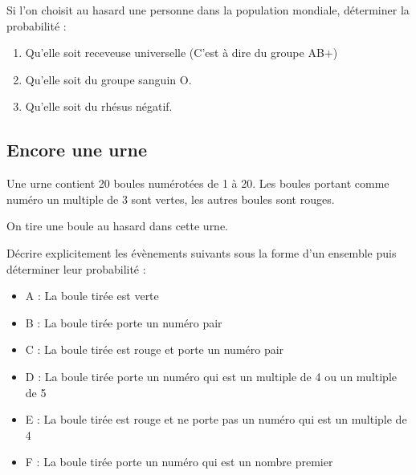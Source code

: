 \documentclass[oneside,12pt]{article}          %
\begin{document}
Si l'on choisit au hasard une personne dans la population mondiale, déterminer la probabilité :
\begin{enumerate}
	\item Qu'elle soit receveuse universelle (C'est à dire du groupe AB+)
	\item Qu'elle soit du groupe sanguin O.
	\item Qu'elle soit du rhésus négatif.
\end{enumerate}



\subsection{Encore une urne}
Une urne contient 20 boules numérotées de 1 à 20. Les boules portant comme numéro un multiple de 3 sont vertes, les autres boules sont rouges.

On tire une boule au hasard dans cette urne.

Décrire explicitement les évènements suivants sous la forme d'un ensemble puis déterminer leur probabilité :
\begin{itemize}[label=$\bullet$]
	\item A : \og La boule tirée est verte \fg
	\item B : \og La boule tirée porte un numéro pair \fg
	\item C : \og La boule tirée est rouge et porte un numéro pair \fg
	\item D : \og La boule tirée porte un numéro qui est un multiple de 4 ou un multiple de 5 \fg
	\item E : \og La boule tirée est rouge et ne porte pas un numéro qui est un multiple de 4 \fg
	\item F : \og La boule tirée porte un numéro qui est un nombre premier \fg
\end{itemize}
\end{document}

